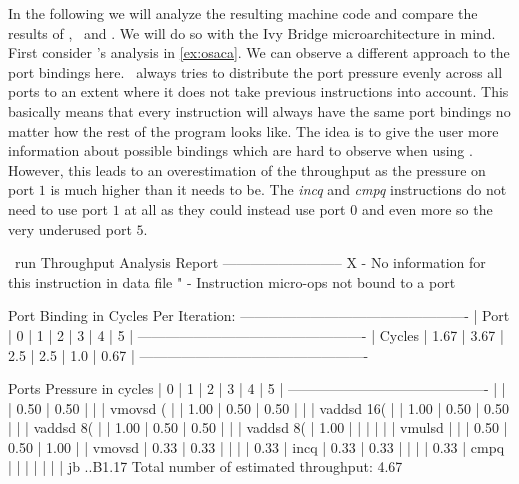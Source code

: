 In the following we will analyze the resulting machine code and compare the results of \iaca, \osaca\ and \suaca. We will do so with the Ivy Bridge microarchitecture in mind. First consider \osaca's analysis in \autoref{ex:osaca}. We can observe a different approach to the port bindings here. \osaca\ always tries to distribute the port pressure evenly across all ports to an extent where it does not take previous instructions into account. This basically means that every instruction will always have the same port bindings no matter how the rest of the program looks like. The idea is to give the user more information about possible bindings which are hard to observe when using \iaca. However, this leads to an overestimation of the throughput as the pressure on port $1$ is much higher than it needs to be. The \emph{incq} and \emph{cmpq} instructions do not need to use port $1$ at all as they could instead use port $0$ and even more so the very underused port $5$. 


\begin{LabeledExample}{\osaca\ run}{\label{ex:osaca}}
    Throughput Analysis Report
    --------------------------
    X - No information for this instruction in data file
    " - Instruction micro-ops not bound to a port
    
    Port Binding in Cycles Per Iteration:
    -------------------------------------------------
    | Port   |   0  |   1  |  2  |  3  |  4  |   5  |
    -------------------------------------------------
    | Cycles | 1.67 | 3.67 | 2.5 | 2.5 | 1.0 | 0.67 |
    -------------------------------------------------
    
    Ports Pressure in cycles
    |   0  |   1  |   2  |   3  |   4  |   5  |
    -------------------------------------------
    |      |      | 0.50 | 0.50 |      |      | vmovsd  (%
    |      | 1.00 | 0.50 | 0.50 |      |      | vaddsd  16(%
    |      | 1.00 | 0.50 | 0.50 |      |      | vaddsd  8(%
    |      | 1.00 | 0.50 | 0.50 |      |      | vaddsd  8(%
    | 1.00 |      |      |      |      |      | vmulsd  %
    |      |      | 0.50 | 0.50 | 1.00 |      | vmovsd  %
    | 0.33 | 0.33 |      |      |      | 0.33 | incq    %
    | 0.33 | 0.33 |      |      |      | 0.33 | cmpq    %
    |      |      |      |      |      |      | jb      ..B1.17
    Total number of estimated throughput: 4.67
\end{LabeledExample}

